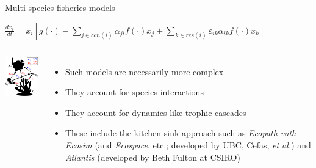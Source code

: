 \documentclass[xcolor={usenames,x11names},compress]{beamer}
\renewcommand{\(}{\begin{columns}}
\renewcommand{\)}{\end{columns}}
\newcommand{\<}[1]{\begin{column}{#1}}
\renewcommand{\>}{\end{column}}
\begin{document}
\begin{frame}{Multi-species fisheries models}

  \pause
  $\frac{dx_{i}}{dt} =  x_{i}\left[g(\cdot) - \sum_{j\in con(i)}\boxed 
    {\alpha_{ji}}f(\cdot)x_{j} + \sum_{k\in res(i)}\varepsilon_{ik} \boxed 
    {\alpha_{ik}}f(\cdot)x_{k} \right]$
  \vspace{10pt}
  \centering
  \begin{columns}[c]
    \column{1.7in}
    \centering
    \includegraphics[width=1.5in]{graphics/FoodWeb.pdf}
    \column{3.2in}
    \begin{itemize}\setlength{\itemindent}{0em} \itemsep10pt
	\pause
      \item Such models are necessarily more complex
      \item They account for species interactions 
      \item They account for dynamics like trophic cascades 
      \item These include the kitchen sink approach such as \textit{Ecopath    
	  with Ecosim} (and \textit{Ecospace}, etc.; developed by UBC, Cefas,           
	\textit{et al.}) and \textit{Atlantis} (developed by Beth Fulton at CSIRO)    
    \end{itemize}
  \end{columns}

\end{frame}
\end{document}
